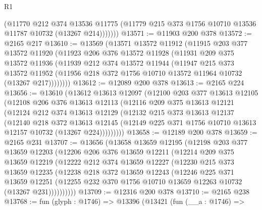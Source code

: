 \begin{lexlean}{R1}
\begin{coremodule}
            (@11770
              @212
              @374
              @13536
              @11775
              (@11779 @215 @373 @1756 @10710 @13536 @11787 @10732 (@13267 @214)))))))
@13571 := @11903 @200 @378
@13572 := @2165 @217
@13610 := @13569
    (@13571
      @13572
      @11912
      (@11915
        @203
        @377
        @13572
        @11920
        (@11923
          @206
          @376
          @13572
          @11928
          (@11931
            @209
            @375
            @13572
            @11936
            (@11939
              @212
              @374
              @13572
              @11944
              (@11947
                @215
                @373
                @13572
                @11952
                (@11956 @218 @372 @1756 @10710 @13572 @11964 @10732 (@13267 @217))))))))
@13612 := @12089 @200 @378
@13613 := @2165 @224
@13656 := @13610
    (@13612
      @13613
      @12097
      (@12100
        @203
        @377
        @13613
        @12105
        (@12108
          @206
          @376
          @13613
          @12113
          (@12116
            @209
            @375
            @13613
            @12121
            (@12124
              @212
              @374
              @13613
              @12129
              (@12132
                @215
                @373
                @13613
                @12137
                (@12140
                  @218
                  @372
                  @13613
                  @12145
                  (@12149 @225 @371 @1756 @10710 @13613 @12157 @10732 (@13267 @224)))))))))
@13658 := @12189 @200 @378
@13659 := @2165 @231
@13707 := @13656
    (@13658
      @13659
      @12195
      (@12198
        @203
        @377
        @13659
        @12203
        (@12206
          @206
          @376
          @13659
          @12211
          (@12214
            @209
            @375
            @13659
            @12219
            (@12222
              @212
              @374
              @13659
              @12227
              (@12230
                @215
                @373
                @13659
                @12235
                (@12238
                  @218
                  @372
                  @13659
                  @12243
                  (@12246
                    @225
                    @371
                    @13659
                    @12251
                    (@12255 @232 @370 @1756 @10710 @13659 @12263 @10732 (@13267 @231))))))))))
@13709 := @12316 @200 @378
@13710 := @2165 @238
@13768 := fun (glyph : @1746) =>
  @13396
    (@13421
      (fun (__a : @1746) =>

\end{coremodule}
\end{lexlean}
